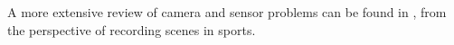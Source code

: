 \documentclass[journal]{IEEEtran}
\begin{document}

A more extensive review of camera and sensor problems can be found in  
\cite{Pueo2016}, from the perspective of recording scenes in sports.
%
%    
%        
%    
\end{document}
